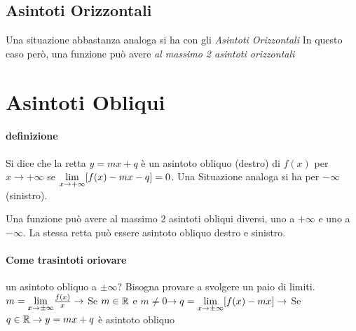\subsection*{Asintoti Orizzontali}
Una situazione abbastanza analoga si ha con gli \emph{Asintoti Orizzontali}
In questo caso però, una funzione può avere \emph{al massimo 2 asintoti orizzontali}

\section{Asintoti Obliqui}
\paragraph*{definizione}{ %
	Si dice che la retta $y=mx + q$ è un asintoto obliquo (destro) di $f(x)$ per $x \to +\infty$ se
	$\underset{x \to +\infty}{\lim} [f(x)-mx-q]=0$.
	Una Situazione analoga si ha per $-\infty $ (sinistro).
}

Una funzione può avere al massimo 2 asintoti obliqui diversi, uno a $+\infty$ e uno a $-\infty$.
La stessa retta può essere asintoto obliquo destro e sinistro.
\paragraph*{Come trasintoti oriovare} un asintoto obliquo a $\pm \infty$? %
Bisogna provare a svolgere un paio di limiti.
\\$m= \underset{x \to \pm \infty}{\lim} \frac{f(x)}{x} \rightarrow$ Se $m\in\mathbb{R}$ e $m\neq 0$$ \rightarrow 
q=\underset{x \to \pm \infty}{\lim} [f(x)-mx] \rightarrow$ Se $q\in\mathbb{R} \rightarrow y=mx+q$ 
è asintoto obliquo
